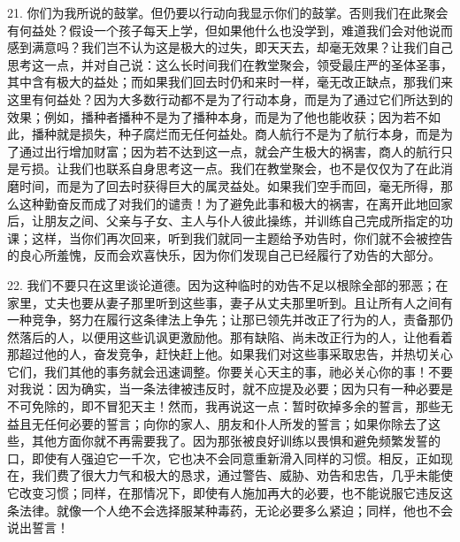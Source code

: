 21. 你们为我所说的鼓掌。但仍要以行动向我显示你们的鼓掌。否则我们在此聚会有何益处？假设一个孩子每天上学，但如果他什么也没学到，难道我们会对他说而感到满意吗？我们岂不认为这是极大的过失，即天天去，却毫无效果？让我们自己思考这一点，并对自己说：这么长时间我们在教堂聚会，领受最庄严的圣体圣事，其中含有极大的益处；而如果我们回去时仍和来时一样，毫无改正缺点，那我们来这里有何益处？因为大多数行动都不是为了行动本身，而是为了通过它们所达到的效果；例如，播种者播种不是为了播种本身，而是为了他也能收获；因为若不如此，播种就是损失，种子腐烂而无任何益处。商人航行不是为了航行本身，而是为了通过出行增加财富；因为若不达到这一点，就会产生极大的祸害，商人的航行只是亏损。让我们也联系自身思考这一点。我们在教堂聚会，也不是仅仅为了在此消磨时间，而是为了回去时获得巨大的属灵益处。如果我们空手而回，毫无所得，那么这种勤奋反而成了对我们的谴责！为了避免此事和极大的祸害，在离开此地回家后，让朋友之间、父亲与子女、主人与仆人彼此操练，并训练自己完成所指定的功课；这样，当你们再次回来，听到我们就同一主题给予劝告时，你们就不会被控告的良心所羞愧，反而会欢喜快乐，因为你们发现自己已经履行了劝告的大部分。\par

22. 我们不要只在这里谈论道德。因为这种临时的劝告不足以根除全部的邪恶；在家里，丈夫也要从妻子那里听到这些事，妻子从丈夫那里听到。且让所有人之间有一种竞争，努力在履行这条律法上争先；让那已领先并改正了行为的人，责备那仍然落后的人，以便用这些讥讽更激励他。那有缺陷、尚未改正行为的人，让他看着那超过他的人，奋发竞争，赶快赶上他。如果我们对这些事采取忠告，并热切关心它们，我们其他的事务就会迅速调整。你要关心天主的事，祂必关心你的事！不要对我说：因为确实，当一条法律被违反时，就不应提及必要；因为只有一种必要是不可免除的，即不冒犯天主！然而，我再说这一点：暂时砍掉多余的誓言，那些无益且无任何必要的誓言；向你的家人、朋友和仆人所发的誓言；如果你除去了这些，其他方面你就不再需要我了。因为那张被良好训练以畏惧和避免频繁发誓的口，即使有人强迫它一千次，它也决不会同意重新滑入同样的习惯。相反，正如现在，我们费了很大力气和极大的恳求，通过警告、威胁、劝告和忠告，几乎未能使它改变习惯；同样，在那情况下，即使有人施加再大的必要，也不能说服它违反这条法律。就像一个人绝不会选择服某种毒药，无论必要多么紧迫；同样，他也不会说出誓言！\par

